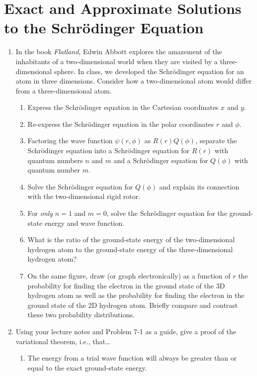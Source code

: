\documentclass[../psets.tex]{subfiles}
\begin{document}
\section{Exact and Approximate Solutions to the Schr\"{o}dinger Equation}
\begin{enumerate}
    \item {}In the book \emph{Flatland}, Edwin Abbott explores the amazement of the inhabitants of a two-dimensional world when they are visited by a three-dimensional sphere. In class, we developed the Schr\"{o}dinger equation for an atom in three dimensions. Consider how a two-dimensional atom would differ from a three-dimensional atom.
    \begin{enumerate}
        \item Express the Schr\"{o}dinger equation in the Cartesian coordinates $x$ and $y$.
        \item Re-express the Schr\"{o}dinger equation in the polar coordinates $r$ and $\phi$.
        \item Factoring the wave function $\psi(r,\phi)$ as $R(r)Q(\phi)$, separate the Schr\"{o}dinger equation into a Schr\"{o}dinger equation for $R(r)$ with quantum numbers $n$ and $m$ and a Schr\"{o}dinger equation for $Q(\phi)$ with quantum number $m$.
        \item Solve the Schr\"{o}dinger equation for $Q(\phi)$ and explain its connection with the two-dimensional rigid rotor.
        \item For \emph{only} $n=1$ and $m=0$, solve the Schr\"{o}dinger equation for the ground-state energy and wave function.
        \item What is the ratio of the ground-state energy of the two-dimensional hydrogen atom to the ground-state energy of the three-dimensional hydrogen atom?
        \item On the same figure, draw (or graph electronically) as a function of $r$ the probability for finding the electron in the ground state of the 3D hydrogen atom as well as the probability for finding the electron in the ground state of the 2D hydrogen atom. Briefly compare and contrast these two probability distributions.
    \end{enumerate}
    \item Using your lecture notes and Problem 7-1 as a guide, give a proof of the variational theorem, i.e., that\dots
    \begin{enumerate}
        \item The energy from a trial wave function will always be greater than or equal to the exact ground-state energy.

\end{enumerate}
\end{enumerate}
\end{document}
